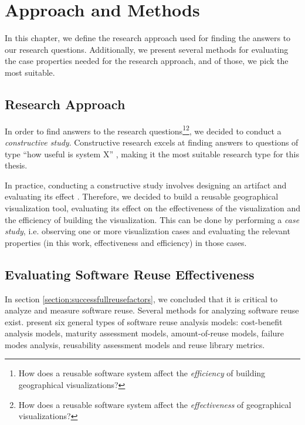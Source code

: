 
\chapter{Approach and Methods}
\label{chapter:methods}

In this chapter, we define the research approach used for finding the answers to our research questions. Additionally, we present several methods for evaluating the case properties needed for the research approach, and of those, we pick the most suitable.

\section{Research Approach}

In order to find answers to the research questions\footnote{How does a reusable software system affect the \emph{efficiency} of building geographical visualizations?}\footnote{How does a reusable software system affect the \emph{effectiveness} of geographical visualizations?}, we decided to conduct a \emph{constructive study}. Constructive research excels at finding answers to questions of type ``how useful is system X'' \citep{jarvinen_tutkimustyon_2012}, making it the most suitable research type for this thesis.

In practice, conducting a constructive study involves designing an artifact and evaluating its effect \citep{jarvinen_tutkimustyon_2012}. Therefore, we decided to build a reusable geographical visualization tool, evaluating its effect on the effectiveness of the visualization and the efficiency of building the visualization. This can be done by performing a \emph{case study}, i.e. observing one or more visualization cases and evaluating the relevant properties (in this work, effectiveness and efficiency) in those cases.

\section{Evaluating Software Reuse Effectiveness}

In section \ref{section:successfullreusefactors}, we concluded that it is critical to analyze and measure software reuse. Several methods for analyzing software reuse exist. \citet{frakes_software_1996} present six general types of software reuse analysis models: cost-benefit analysis models, maturity assessment models, amount-of-reuse models, failure modes analysis, reusability assessment models and reuse library metrics. 

